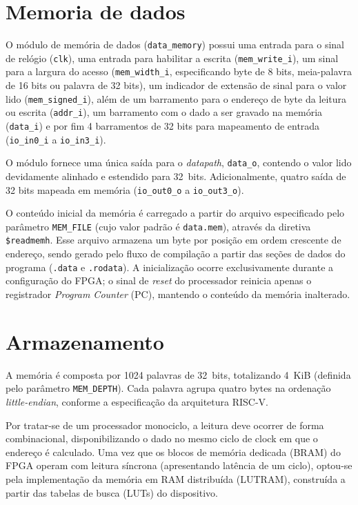\section{Memoria de dados}
\label{sec:memoria_dados}

O módulo de memória de dados (\texttt{data\_memory}) possui uma entrada para o sinal de relógio (\texttt{clk}), uma entrada para habilitar a escrita (\texttt{mem\_write\_i}), um sinal para a largura do acesso (\texttt{mem\_width\_i}, especificando byte de 8 bits, meia-palavra de 16 bits ou palavra de 32 bits), um indicador de extensão de sinal para o valor lido (\texttt{mem\_signed\_i}), além de um barramento para o endereço de byte da leitura ou escrita (\texttt{addr\_i}), um barramento com o dado a ser gravado na memória (\texttt{data\_i}) e por fim 4 barramentos de 32 bits para mapeamento de entrada  (\texttt{io\_in0\_i} a \texttt{io\_in3\_i}).


O módulo fornece uma única saída para o \textit{datapath}, \texttt{data\_o}, contendo o valor lido devidamente alinhado e estendido para 32~bits. Adicionalmente, quatro saída de 32 bits mapeada em memória (\texttt{io_out0\_o} a \texttt{io\_out3\_o}).

O conteúdo inicial da memória é carregado a partir do arquivo especificado pelo parâmetro \texttt{MEM\_FILE} (cujo valor padrão é \texttt{data.mem}), através da diretiva \texttt{\$readmemh}. Esse arquivo armazena um byte por posição em ordem crescente de endereço, sendo gerado pelo fluxo de compilação a partir das seções de dados do programa (\texttt{.data} e \texttt{.rodata}). A inicialização ocorre exclusivamente durante a configuração do FPGA; o sinal de \textit{reset} do processador reinicia apenas o registrador \textit{Program Counter} (PC), mantendo o conteúdo da memória inalterado.

\section{Armazenamento}

A memória é composta por 1024 palavras de 32~bits, totalizando 4~KiB (definida pelo parâmetro \texttt{MEM\_DEPTH}). Cada palavra agrupa quatro bytes na ordenação \textit{little-endian}, conforme a especificação da arquitetura RISC-V. 

Por tratar-se de um processador monociclo, a leitura deve ocorrer de forma combinacional, disponibilizando o dado no mesmo ciclo de clock em que o endereço é calculado. Uma vez que os blocos de memória dedicada (BRAM) do FPGA operam com leitura síncrona (apresentando latência de um ciclo), optou-se pela implementação da memória em RAM distribuída (LUTRAM), construída a partir das tabelas de busca (LUTs) do dispositivo. 


